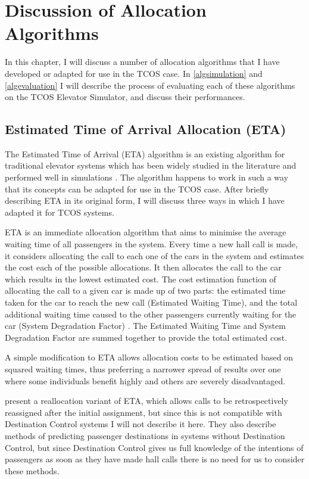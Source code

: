 \documentclass{UoYCSproject}
\begin{document}
\chapter{Discussion of Allocation Algorithms}
\label{algdiscussion}

In this chapter, I will discuss a number of allocation algorithms that I have developed or adapted for use in the TCOS case.  In \autoref{algsimulation} and \autoref{algevaluation} I will describe the process of evaluating each of these algorithms on the TCOS Elevator Simulator, and discuss their performances.

\section{Estimated Time of Arrival Allocation (ETA)}
\label{algETAdescription}

The Estimated Time of Arrival (ETA) algorithm is an existing algorithm for traditional elevator systems which has been widely studied in the literature \citep{Rong2003, Nikovski2003} and performed well in simulations \citep{Rong2003}.  The algorithm happens to work in such a way that its concepts can be adapted for use in the TCOS case.  After briefly describing ETA in its original form, I will discuss three ways in which I have adapted it for TCOS systems.

ETA is an immediate allocation algorithm that aims to minimise the average waiting time of all passengers in the system.  Every time a new hall call is made, it considers allocating the call to each one of the cars in the system and estimates the cost each of the possible allocations.  It then allocates the call to the car which results in the lowest estimated cost.  The cost estimation function of allocating the call to a given car is made up of two parts: the estimated time taken for the car to reach the new call (Estimated Waiting Time), and the total additional waiting time caused to the other passengers currently waiting for the car (System Degradation Factor) \citep{Rong2003}.  The Estimated Waiting Time and System Degradation Factor are summed together to provide the total estimated cost.

A simple modification to ETA allows allocation costs to be estimated based on squared waiting times, thus preferring a narrower spread of results over one where some individuals benefit highly and others are severely disadvantaged.

\citet{Rong2003} present a reallocation variant of ETA, which allows calls to be retrospectively reassigned after the initial assignment, but since this is not compatible with Destination Control systems I will not describe it here.  They also describe methods of predicting passenger destinations in systems without Destination Control, but since Destination Control gives us full knowledge of the intentions of passengers as soon as they have made hall calls there is no need for us to consider these methods.
\end{document}
